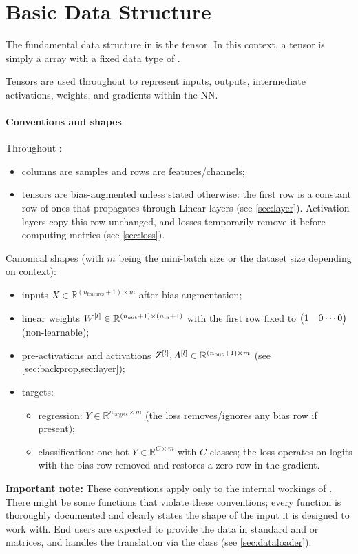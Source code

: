 \section{Basic Data Structure} \label{sec:tensor}

The fundamental data structure in \mfnet is the tensor. In this context, a tensor is simply a  array with a fixed data type of . 

Tensors are used throughout \mfnet to represent inputs, outputs, intermediate activations, weights, and gradients within the \acl{NN}.

\paragraph{Conventions and shapes} Throughout \mfnet:
\begin{itemize}
    \item columns are samples and rows are features/channels;
    \item tensors are bias-augmented unless stated otherwise: the first row is a constant row of ones that propagates through Linear layers (see \cref{sec:layer}). Activation layers copy this row unchanged, and losses temporarily remove it before computing metrics (see \cref{sec:loss}).
\end{itemize}

Canonical shapes (with $m$ being the mini-batch size or the dataset size depending on context):
\begin{itemize}
    \item inputs $X \in \mathbb{R}^{(n_\text{features}+1)\times m}$ after bias augmentation;
    \item linear weights $W^{[l]} \in \mathbb{R}^{(n_\text{out}+1)\times(n_\text{in}+1)}$ with the first row fixed to $\mqty(1 & 0 \cdots 0)$ (non-learnable);
    \item pre-activations and activations $Z^{[l]}, A^{[l]} \in \mathbb{R}^{(n_\text{out}+1)\times m}$ (see \cref{sec:backprop,sec:layer});
    \item targets:
    \begin{itemize}
        \item regression: $Y \in \mathbb{R}^{n_\text{targets}\times m}$ (the loss removes/ignores any bias row if present);
        \item classification: one-hot $Y \in \mathbb{R}^{C\times m}$ with $C$ classes; the loss operates on logits with the bias row removed and restores a zero row in the gradient.
    \end{itemize}
\end{itemize}

\textbf{Important note:} These conventions apply only to the internal workings of \mfnet. There might be some functions that violate these conventions; every function is thoroughly documented and clearly states the shape of the input it is designed to work with. End users are expected to provide the data in standard  and  or  matrices, and \mfnet handles the translation via the  class (see \cref{sec:dataloader}).
